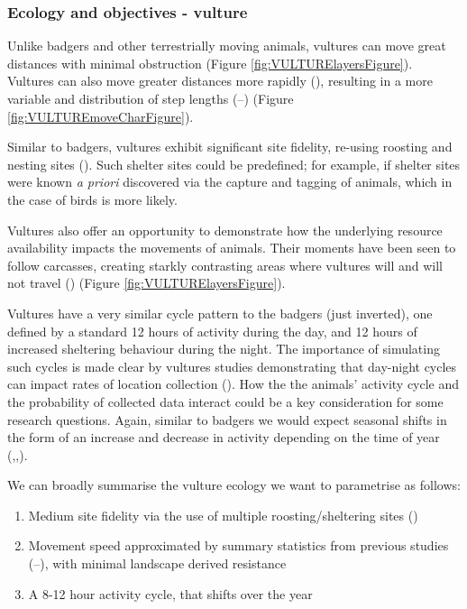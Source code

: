 \documentclass[10pt,a4paper]{article}
\begin{document}
\subsubsection{Ecology and objectives - vulture}\label{ecology-and-objectives---vulture}

Unlike badgers and other terrestrially moving animals, vultures can move great distances with minimal obstruction (Figure \ref{fig:VULTURElayersFigure}).
Vultures can also move greater distances more rapidly (), resulting in a more variable and distribution of step lengths (--) (Figure \ref{fig:VULTUREmoveCharFigure}).

Similar to badgers, vultures exhibit significant site fidelity, re-using roosting and nesting sites ().
Such shelter sites could be predefined; for example, if shelter sites were known \emph{a priori} discovered via the capture and tagging of animals, which in the case of birds is more likely.

Vultures also offer an opportunity to demonstrate how the underlying resource availability impacts the movements of animals.
Their moments have been seen to follow carcasses, creating starkly contrasting areas where vultures will and will not travel () (Figure \ref{fig:VULTURElayersFigure}).

Vultures have a very similar cycle pattern to the badgers (just inverted), one defined by a standard 12 hours of activity during the day, and 12 hours of increased sheltering behaviour during the night.
The importance of simulating such cycles is made clear by vultures studies demonstrating that day-night cycles can impact rates of location collection ().
How the the animals' activity cycle and the probability of collected data interact could be a key consideration for some research questions.
Again, similar to badgers we would expect seasonal shifts in the form of an increase and decrease in activity depending on the time of year (,,).

We can broadly summarise the vulture ecology we want to parametrise as follows:

\begin{enumerate}
\def\labelenumi{\arabic{enumi}.}
\item
  Medium site fidelity via the use of multiple roosting/sheltering sites ()
\item
  Movement speed approximated by summary statistics from previous studies (--), with minimal landscape derived resistance
\item
  A 8-12 hour activity cycle, that shifts over the year
\end{enumerate}
\end{document}
